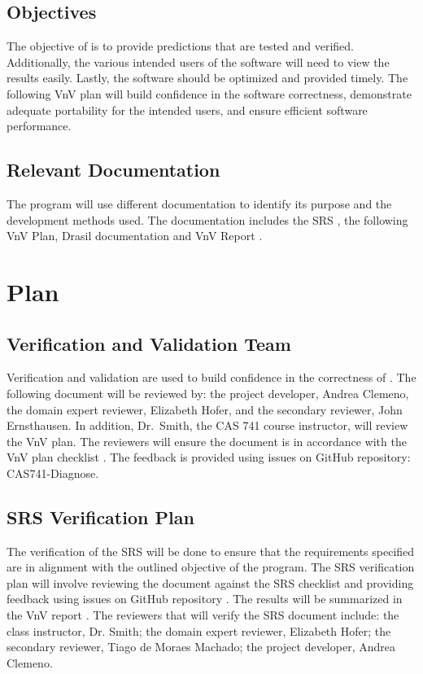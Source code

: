\documentclass[12pt, titlepage]{article}
\begin{document}
\subsection{Objectives}

The objective of \progname{} is to provide predictions that are tested and 
verified. Additionally, the various intended users of the software will need to view the 
results easily. Lastly, the software should be optimized and provided timely. 
The following VnV plan will build confidence in the software correctness, 
demonstrate adequate portability for the intended users, and ensure efficient 
software performance.


\subsection{Relevant Documentation}

The \progname{} program will use different documentation to identify its 
purpose and the development methods used. The documentation includes the SRS 
\citep{SRS}, the following VnV Plan, Drasil documentation \citep{DrasilSRS}
and VnV Report \citep{DiagnoseVNVreport}.



\section{Plan}
	
\subsection{Verification and Validation Team}

Verification and validation are used to build confidence in the correctness of 
\progname{}. The following document will be reviewed by: the project developer, 
Andrea Clemeno, the domain expert reviewer, Elizabeth Hofer, and the secondary 
reviewer, John Ernsthausen. In addition, Dr.\ Smith, the CAS 741 course 
instructor, will review the VnV plan. The reviewers will ensure the document is 
in accordance with the VnV plan checklist \citep{Vnvchecklist}. The feedback 
is provided using issues on GitHub repository: CAS741-Diagnose. 

\subsection{SRS Verification Plan}

The verification of the SRS will be done to ensure that the requirements 
specified are in alignment with the outlined objective of the \progname{} 
program. The SRS verification plan will involve reviewing the document against 
the SRS checklist and providing feedback using issues on GitHub repository 
\citep{SRSchecklist}. The results will be summarized in the VnV report 
\citep{DiagnoseVNVreport}. The 
reviewers that will verify the SRS document include: the class instructor, Dr. 
Smith;  the domain expert reviewer, Elizabeth Hofer; the secondary reviewer, 
Tiago de Moraes Machado; the project developer, Andrea Clemeno.
\end{document}
